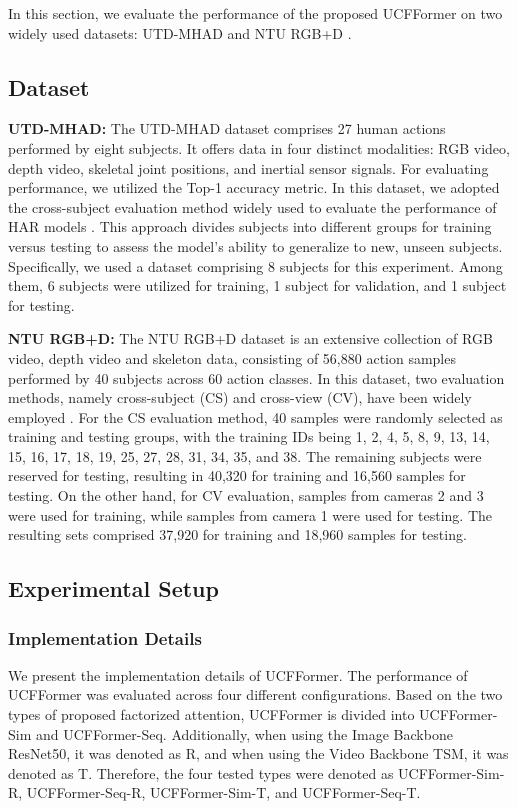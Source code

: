 In this section, we evaluate the performance of the proposed UCFFormer on two widely used datasets: UTD-MHAD \cite{chen2015utd} and NTU RGB+D \cite{shahroudy2016ntu}. 

\subsection{Dataset} 

\textbf{UTD-MHAD:} The UTD-MHAD dataset comprises 27 human actions performed by eight subjects. It offers data in four distinct modalities: RGB video, depth video, skeletal joint positions, and inertial sensor signals.
For evaluating performance, we utilized the Top-1 accuracy metric. In this dataset, we adopted the cross-subject evaluation method widely used to evaluate the performance of HAR models \cite{chen2015utd}. This approach divides subjects into different groups for training versus testing to assess the model's ability to generalize to new, unseen subjects. Specifically, we used a dataset comprising 8 subjects for this experiment. Among them, 6 subjects were utilized for training, 1 subject for validation, and 1 subject for testing. 


\textbf{NTU RGB+D:} The NTU RGB+D dataset is an extensive collection of RGB video, depth video and skeleton data, consisting of 56,880 action samples performed by 40 subjects across 60 action classes.  In this dataset, two evaluation methods, namely cross-subject (CS) and cross-view (CV), have been widely employed \cite{shahroudy2016ntu}. For the CS evaluation method, 40 samples were randomly selected as training and testing groups, with the training IDs being 1, 2, 4, 5, 8, 9, 13, 14, 15, 16, 17, 18, 19, 25, 27, 28, 31, 34, 35, and 38. The remaining subjects were reserved for testing, resulting in 40,320 for training and 16,560 samples for testing. On the other hand, for CV evaluation, samples from cameras 2 and 3 were used for training, while samples from camera 1 were used for testing. The resulting sets comprised 37,920  for training and 18,960 samples for testing.

\subsection{Experimental Setup}

\subsubsection{Implementation Details}
We present the implementation details of UCFFormer. 
The performance of UCFFormer was evaluated across four different configurations. Based on the two types of proposed  factorized attention, UCFFormer is divided into UCFFormer-Sim and UCFFormer-Seq. Additionally, when using the Image Backbone ResNet50, it was denoted as R, and when using the Video Backbone TSM, it was denoted as T. Therefore, the four tested types were denoted as UCFFormer-Sim-R, UCFFormer-Seq-R, UCFFormer-Sim-T, and UCFFormer-Seq-T.

